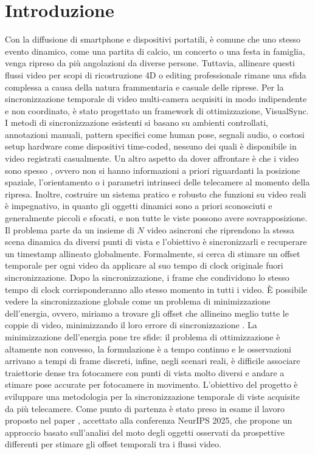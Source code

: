 \graphicspath{{chapters/chapter1/img}}
\chapter{Introduzione} \label{introduzione}
Con la diffusione di smartphone e dispositivi portatili, è comune che uno stesso evento dinamico, come una partita di calcio, un concerto o una festa in famiglia, venga ripreso da più angolazioni da diverse persone. Tuttavia, allineare questi flussi video per scopi di ricostruzione 4D o editing professionale rimane una sfida complessa a causa della natura frammentaria e casuale delle riprese. 
Per la sincronizzazione temporale di video multi-camera acquisiti in modo indipendente e non coordinato, è stato progettato un framework di ottimizzazione, VisualSync.
I metodi di sincronizzazione esistenti si basano su ambienti controllati, annotazioni manuali, pattern specifici come human pose, segnali audio, o costosi setup hardware come dispositivi time-coded, nessuno dei quali è disponibile in video registrati casualmente. 
Un altro aspetto da dover affrontare è che i video sono spesso , ovvero non si hanno informazioni a priori riguardanti la posizione spaziale, l'orientamento o i parametri intrinseci delle telecamere al momento della ripresa.
Inoltre, costruire un sistema pratico e robusto che funzioni su video reali è impegnativo, in quanto gli oggetti dinamici sono a priori sconosciuti e generalmente piccoli e sfocati, e non tutte le viste possono avere sovrapposizione.
Il problema parte da un insieme di $N$ video asincroni che riprendono la stessa scena dinamica da diversi punti di vista e l'obiettivo è sincronizzarli e recuperare un timestamp allineato globalmente. Formalmente, si cerca di stimare un offset temporale per ogni video da applicare al suo tempo di clock originale fuori sincronizzazione. Dopo la sincronizzazione, i frame che condividono lo stesso tempo di clock corrisponderanno allo stesso momento in tutti i video. È possibile vedere  la sincronizzazione globale come un problema di minimizzazione dell'energia, ovvero, miriamo a trovare gli offset che allineino meglio tutte le coppie di video, minimizzando il loro errore di sincronizzazione . La minimizzazione dell'energia pone tre sfide: il problema di ottimizzazione è altamente non convesso, la formulazione è a tempo continuo e le osservazioni arrivano a tempi di frame discreti, infine, negli scenari reali, è difficile associare traiettorie dense tra fotocamere con punti di vista molto diversi e andare a stimare pose accurate per fotocamere in movimento.
L'obiettivo del progetto è sviluppare una metodologia per la sincronizzazione temporale di viste acquisite da più telecamere. Come punto di partenza è stato preso in esame il lavoro proposto nel paper  \cite{visualsync}, accettato alla conferenza NeurIPS 2025, che propone un approccio basato sull'analisi del moto degli oggetti osservati da prospettive differenti per stimare gli offset temporali tra i flussi video. 

